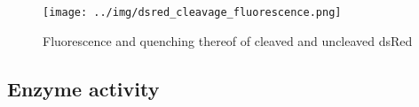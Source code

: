 \begin{figure}
	\centering
	\texttt{[image: ../img/dsred\_cleavage\_fluorescence.png]}
	\caption{Fluorescence and quenching thereof of cleaved and uncleaved dsRed}
	\label{fig:dsred_cleavage_fluorescence}
\end{figure}

\subsection{Enzyme activity}






